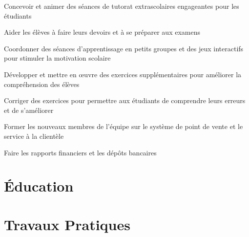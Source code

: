 \documentclass[letterpaper,10pt]{article}
\begin{document}
  \begin{resume_list}
    \item Concevoir et animer des séances de tutorat extrascolaires engageantes pour les étudiants
    \item Aider les élèves à faire leurs devoirs et à se préparer aux examens
    \item Coordonner des séances d'apprentissage en petits groupes et des jeux interactifs pour stimuler la motivation scolaire
    \item Développer et mettre en œuvre des exercices supplémentaires pour améliorer la compréhension des élèves
    \item Corriger des exercices pour permettre aux étudiants de comprendre leurs erreurs et de s'améliorer
  \end{resume_list}

  \begin{resume_list}
    \item Former les nouveaux membres de l'équipe sur le système de point de vente et le service à la clientèle
    \item Faire les rapports financiers et les dépôts bancaires
  \end{resume_list}


  \section{Éducation}

  \vspace{10pt}
  \pagebreak


  \section{Travaux Pratiques}
\end{document}

